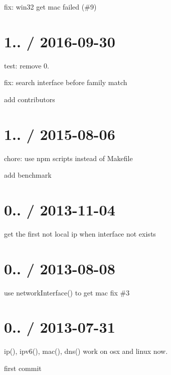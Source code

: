 
\begin{DoxyItemize}
\item fix\+: win32 get mac failed (\#9)
\end{DoxyItemize}

\section*{1.. / 2016-\/09-\/30 }


\begin{DoxyItemize}
\item test\+: remove 0.
\item fix\+: search interface before family match
\item add contributors
\end{DoxyItemize}

\section*{1.. / 2015-\/08-\/06 }


\begin{DoxyItemize}
\item chore\+: use npm scripts instead of Makefile
\item add benchmark
\end{DoxyItemize}

\section*{0.. / 2013-\/11-\/04 }


\begin{DoxyItemize}
\item get the first not local ip when interface not exists
\end{DoxyItemize}

\section*{0.. / 2013-\/08-\/08 }


\begin{DoxyItemize}
\item use network\+Interface() to get mac fix \#3
\end{DoxyItemize}

\section*{0.. / 2013-\/07-\/31 }


\begin{DoxyItemize}
\item ip(), ipv6(), mac(), dns() work on osx and linux now.
\item first commit 
\end{DoxyItemize}